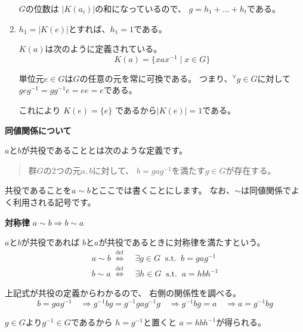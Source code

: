 \documentclass[12pt,b5paper]{ltjsarticle}
\begin{document}
\begin{enumerate}
       $G$の位数は
       $|K(a_{i})|$の和になっているので、
       $g=h_{1}+\dots + h_{t}$である。

       \hrulefill

 \item $h_{1}=|K(e)|$とすれば、$h_{1}=1$である。

       \dotfill

       $K(a)$は次のように定義されている。
       \begin{equation}
        K(a) = \{xax^{-1} \mid x\in G \}
       \end{equation}

       単位元$e\in G$は$G$の任意の元を常に可換である。
       つまり、${}^{\forall}g\in G$に対して
       $geg^{-1}=gg^{-1}e=ee=e$である。

       これにより
       $K(e)=\{e\}$
       であるから$|K(e)|=1$である。

       \hrulefill

\end{enumerate}




\textbf{同値関係について}

$a$と$b$が共役であることとは次のような定義です。
\begin{quote}
 群$G$の2つの元$a,b$に対して、
 $b=gag^{-1}$を満たす$g\in G$が存在する。
\end{quote}
共役であることを$a\sim b$とここでは書くことにします。
なお、$\sim$は同値関係でよく利用される記号です。


\textbf{対称律}
$a \sim b \Rightarrow b \sim a$

$a$と$b$が共役であれば
$b$と$a$が共役であるときに対称律を満たすという。
\begin{align}
 a \sim b \; \overset{\mathrm{def}}{\Longleftrightarrow} & \;
  \exists g \in G \;\; \mathrm{s.t.} \;\; b=gag^{-1}\\
 b \sim a \; \overset{\mathrm{def}}{\Longleftrightarrow} & \;
  \exists h \in G \;\; \mathrm{s.t.} \;\; a=hbh^{-1}
\end{align}

上記式が共役の定義からわかるので、
右側の関係性を調べる。
\begin{equation}
 b=gag^{-1}
  \quad \Rightarrow g^{-1}bg = g^{-1}gag^{-1}g
  \quad \Rightarrow g^{-1}bg = a
  \quad \Rightarrow a = g^{-1}bg
\end{equation}

$g\in G$より$g^{-1}\in G$であるから
$h=g^{-1}$と置くと
$a=hbh^{-1}$が得られる。
\end{document}
